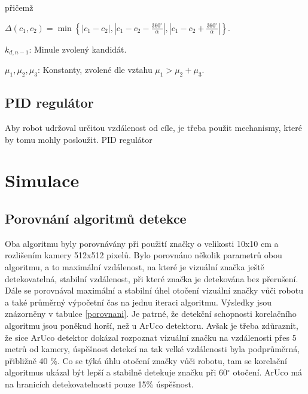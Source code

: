 \documentclass[twoside]{ctuthesis}
\theoremstyle{plain}
\theoremstyle{definition}
\theoremstyle{note}
\begin{document}
přičemž

$\Delta(c_1, c_2) = \min\left\{|c_1 - c_2|, |c_1 - c_2 - \frac{360^{\circ}}{\alpha}|, |c_1 - c_2 + \frac{360^{\circ}}{\alpha}|\right\}$.

$k_{d, n-1}$: Minule zvolený kandidát.

$\mu_1, \mu_2, \mu_3$: Konstanty, zvolené dle vztahu $\mu_1 > \mu_2 + \mu_3$.

\section{PID regulátor}

Aby robot udržoval určitou vzdálenost od cíle, je třeba použit mechanismy, které by tomu mohly posloužit. PID regulátor 



\chapter{Simulace}

\section{Porovnání algoritmů detekce}

Oba algoritmu byly porovnávány při použití značky o velikosti 10x10 cm a rozlišením kamery 512x512 pixelů. Bylo porovnáno několik parametrů obou algoritmu, a to maximální vzdálenost, na které je vizuální značka ještě detekovatelná, stabilní vzdálenost, při které značka je detekována bez přerušení. Dále se porovnával maximální a stabilní úhel otočení vizuální značky vůči robotu a také průměrný výpočetní čas na jednu iteraci algoritmu. Výsledky jsou znázorněny v tabulce \ref{porovnani}. Je patrné, že detekční schopnosti korelačního algoritmu jsou poněkud horší, než u ArUco detektoru. Avšak je třeba zdůraznit, že sice ArUco detektor dokázal rozpoznat vizuální značku na vzdálenosti přes 5 metrů od kamery, úspěšnost detekcí na tak velké vzdálenosti byla podprůměrná, přibližně 40 \%. Co se týká úhlu otočení značky vůči robotu, tam se korelační algoritmus ukázal být lepší a stabilně detekuje značku při 60$^\circ$ otočení. ArUco má na hranicích detekovatelnosti pouze 15\% úspěšnost.
\end{document}
